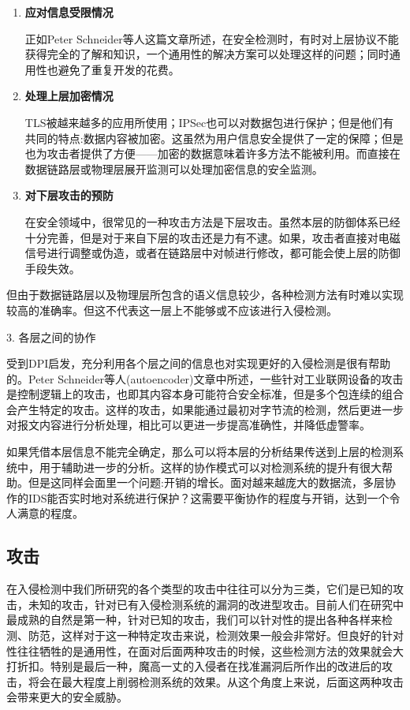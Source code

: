 \documentclass[11pt]{article} %
\begin{document}
\begin{enumerate}
    \item \textbf{应对信息受限情况}

    正如Peter Schneider等人这篇文章所述，在安全检测时，有时对上层协议不能获得完全的了解和知识，一个通用性的解决方案可以处理这样的问题；同时通用性也避免了重复开发的花费。

    \item \textbf{处理上层加密情况}

    TLS被越来越多的应用所使用；IPSec也可以对数据包进行保护；但是他们有共同的特点:数据内容被加密。这虽然为用户信息安全提供了一定的保障；但是也为攻击者提供了方便——加密的数据意味着许多方法不能被利用。而直接在数据链路层或物理层展开监测可以处理加密信息的安全监测。

    \item \textbf{对下层攻击的预防}

    在安全领域中，很常见的一种攻击方法是下层攻击。虽然本层的防御体系已经十分完善，但是对于来自下层的攻击还是力有不逮。如果，攻击者直接对电磁信号进行调整或伪造，或者在链路层中对帧进行修改，都可能会使上层的防御手段失效。
\end{enumerate}

但由于数据链路层以及物理层所包含的语义信息较少，各种检测方法有时难以实现较高的准确率。但这不代表这一层上不能够或不应该进行入侵检测。

3. 各层之间的协作

受到DPI启发，充分利用各个层之间的信息也对实现更好的入侵检测是很有帮助的。Peter Schneider等人(autoencoder)文章中所述，一些针对工业联网设备的攻击是控制逻辑上的攻击，也即其内容本身可能符合安全标准，但是多个包连续的组合会产生特定的攻击。这样的攻击，如果能通过最初对字节流的检测，然后更进一步对报文内容进行分析处理，相比可以更进一步提高准确性，并降低虚警率。

如果凭借本层信息不能完全确定，那么可以将本层的分析结果传送到上层的检测系统中，用于辅助进一步的分析。这样的协作模式可以对检测系统的提升有很大帮助。但是这同样会面里一个问题:开销的增长。面对越来越庞大的数据流，多层协作的IDS能否实时地对系统进行保护？这需要平衡协作的程度与开销，达到一个令人满意的程度。

\subsection{攻击}
\label{attack}

在入侵检测中我们所研究的各个类型的攻击中往往可以分为三类，它们是已知的攻击，未知的攻击，针对已有入侵检测系统的漏洞的改进型攻击。目前人们在研究中最成熟的自然是第一种，针对已知的攻击，我们可以针对性的提出各种各样来检测、防范，这样对于这一种特定攻击来说，检测效果一般会非常好。但良好的针对性往往牺牲的是通用性，在面对后面两种攻击的时候，这些检测方法的效果就会大打折扣。特别是最后一种，魔高一丈的入侵者在找准漏洞后所作出的改进后的攻击，将会在最大程度上削弱检测系统的效果。从这个角度上来说，后面这两种攻击会带来更大的安全威胁。
\end{document}
